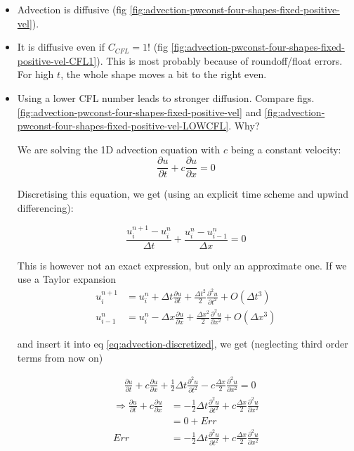 \begin{itemize}


	\item Advection is diffusive (fig \ref{fig:advection-pwconst-four-shapes-fixed-positive-vel}).
	
	
	
	
	\item It is diffusive even if $C_{CFL} = 1$! (fig \ref{fig:advection-pwconst-four-shapes-fixed-positive-vel-CFL1}). 
            This is most probably because of roundoff/float errors. For high $t$, the whole shape moves a bit to the right even.
 
 
            
    \item Using a lower CFL number leads to stronger diffusion. 
    	Compare figs. \ref{fig:advection-pwconst-four-shapes-fixed-positive-vel} and \ref{fig:advection-pwconst-four-shapes-fixed-positive-vel-LOWCFL}. Why?
    
    	We are solving the 1D advection equation with $c$ being a constant velocity:
    	\begin{equation}
    		\frac{\partial u}{\partial t} + c\frac{\partial u}{\partial x} = 0 \label{eq:advection-1D}
    	\end{equation}
    
    	Discretising this equation, we get (using an explicit time scheme and upwind differencing):
    	
    	\begin{equation}
    		\frac{u_i^{n+1} - u_i^n}{\Delta t}+\frac{u_i^n-u_{i-1}^{n}}{\Delta x} = 0 \label{eq:advection-discretized}
    	\end{equation}
    	
    	This is however not an exact expression, but only an approximate one.
    	If we use a Taylor expansion
    	\begin{align}
    		u_i^{n+1} &= u_i^n + \Delta t \frac{\partial u}{\partial t}+\frac{\Delta t^2}{2}\frac{\partial^2 u }{\partial t^2}+O(\Delta t^3) \\
    		u_{i-1}^{n} &= u_{i}^n - \Delta x \frac{\partial u}{\partial x}+\frac{\Delta x^2}{2}\frac{\partial^2 u }{\partial x^2}+O(\Delta x^3)
    	\end{align}

		and insert it into eq \ref{eq:advection-discretized}, we get (neglecting third order terms from now on)
		
		\begin{align}
			& \frac{\partial u}{\partial t} + c\frac{\partial u}{\partial x} + \frac{1}{2}\Delta t \frac{\partial^2 u }{\partial t^2} - c \frac{\Delta x}{2} \frac{\partial^2 u }{\partial x^2} = 0
		\end{align}
		\begin{align}
			\Rightarrow \frac{\partial u}{\partial t} + c\frac{\partial u}{\partial x} &= 
				-\frac{1}{2}\Delta t\frac{\partial^2 u }{\partial t^2} + c \frac{\Delta x}{2} \frac{\partial^2 u }{\partial x^2} \\
				&= 0 + Err \\
			Err &= -\frac{1}{2}\Delta t\frac{\partial^2 u }{\partial t^2} + c \frac{\Delta x}{2} \frac{\partial^2 u }{\partial x^2}
		\end{align}
		

\end{itemize}
